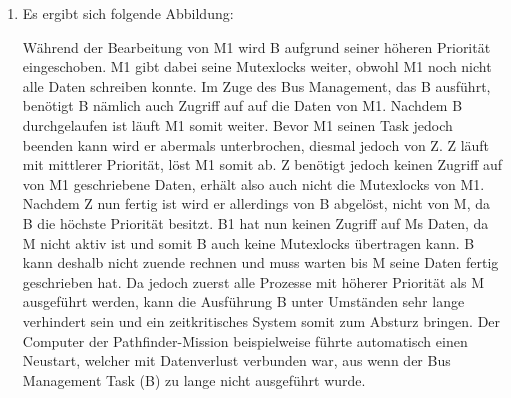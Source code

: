 \documentclass[a4paper,11pt,ngerman]{scrartcl}
\begin{document}
\begin{enumerate}[\bf a)]
    \item Es ergibt sich folgende Abbildung:
    \begin{center}
        \scalebox{0.4}{}
    \end{center}
    
    
    Während der Bearbeitung von M1 wird B aufgrund seiner höheren Priorität eingeschoben. M1 gibt dabei seine Mutexlocks weiter, obwohl M1 noch nicht alle Daten schreiben konnte. Im Zuge des Bus Management, das B ausführt, benötigt B nämlich auch Zugriff auf auf die Daten von M1. Nachdem B durchgelaufen ist läuft M1 somit weiter. Bevor M1 seinen Task jedoch beenden kann wird er abermals unterbrochen, diesmal jedoch von Z. Z läuft mit mittlerer Priorität, löst M1 somit ab. Z benötigt jedoch keinen Zugriff auf von M1 geschriebene Daten, erhält also auch nicht die Mutexlocks von M1. Nachdem Z nun fertig ist wird er allerdings von B abgelöst, nicht von M, da B die höchste Priorität besitzt. B1 hat nun keinen Zugriff auf Ms Daten, da M nicht aktiv ist und somit B auch keine Mutexlocks übertragen kann. B kann deshalb nicht zuende rechnen und muss warten bis M seine Daten fertig geschrieben hat. Da jedoch zuerst alle Prozesse mit höherer Priorität als M ausgeführt werden, kann die Ausführung B unter Umständen sehr lange verhindert sein und ein zeitkritisches System somit zum Absturz bringen. Der Computer der Pathfinder-Mission beispielweise führte automatisch einen Neustart, welcher mit Datenverlust verbunden war, aus wenn der Bus Management Task (B) zu lange nicht ausgeführt wurde. 
\end{enumerate}
\end{document}
